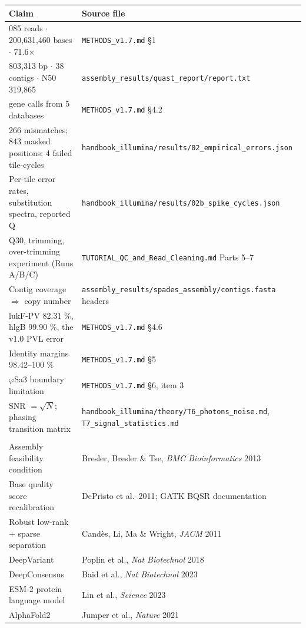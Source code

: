 \begin{center}\small
\begin{tabular}{@{}>{\raggedright\arraybackslash}p{6.1cm}>{\raggedright\arraybackslash}p{10.5cm}@{}}
\toprule
\rowcolor{slate!14}
\textbf{Claim} & \textbf{Source file}\\
\midrule
858{,}085 reads $\cdot$ 200{,}631{,}460 bases $\cdot$ 71.6$\times$ & \texttt{METHODS\_v1.7.md} §1\\
2{,}803{,}313 bp $\cdot$ 38 contigs $\cdot$ N50 319{,}865 & \texttt{assembly\_results/quast\_report/report.txt}\\
118 gene calls from 5 databases & \texttt{METHODS\_v1.7.md} §4.2\\
28{,}266 mismatches; 843 masked positions; 4 failed tile-cycles &
 \texttt{handbook\_illumina/results/02\_empirical\_errors.json}\\
Per-tile error rates, substitution spectra, reported Q &
 \texttt{handbook\_illumina/results/02b\_spike\_cycles.json}\\
Q30, trimming, over-trimming experiment (Runs A/B/C) & \texttt{TUTORIAL\_QC\_and\_Read\_Cleaning.md} Parts 5--7\\
Contig coverage $\Rightarrow$ copy number & \texttt{assembly\_results/spades\_assembly/contigs.fasta} headers\\
lukF-PV 82.31 \%, hlgB 99.90 \%, the v1.0 PVL error & \texttt{METHODS\_v1.7.md} §4.6\\
Identity margins 98.42--100 \% & \texttt{METHODS\_v1.7.md} §5\\
$\varphi$Sa3 boundary limitation & \texttt{METHODS\_v1.7.md} §6, item 3\\
SNR $=\sqrt{N}$; phasing transition matrix & \texttt{handbook\_illumina/theory/T6\_photons\_noise.md}, \texttt{T7\_signal\_statistics.md}\\
\midrule
\multicolumn{2}{@{}l}{\textbf{\color{slate}External results cited}}\\
Assembly feasibility condition & Bresler, Bresler \& Tse, \textit{BMC Bioinformatics} 2013\\
Base quality score recalibration & DePristo et al.\ 2011; GATK BQSR documentation\\
Robust low-rank $+$ sparse separation & Candès, Li, Ma \& Wright, \textit{JACM} 2011\\
DeepVariant & Poplin et al., \textit{Nat Biotechnol} 2018\\
DeepConsensus & Baid et al., \textit{Nat Biotechnol} 2023\\
ESM-2 protein language model & Lin et al., \textit{Science} 2023\\
AlphaFold2 & Jumper et al., \textit{Nature} 2021\\
\bottomrule
\end{tabular}
\end{center}

